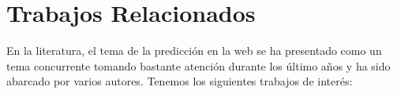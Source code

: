 
\section{Trabajos Relacionados}

En la literatura, el tema de la predicción en la web se ha presentado como un tema concurrente tomando bastante atención durante los último años y ha sido abarcado por 
varios autores. Tenemos los siguientes trabajos de interés:





